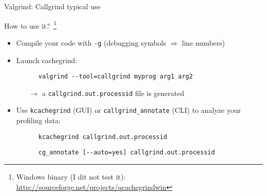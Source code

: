 \documentclass[10pt,xcolor=table]{beamer}
\begin{document}

\begin{frame}[fragile]{Valgrind: Callgrind typical use}

  How to use it?~\footnote{Windows binary (I dit not test it):
    \url{http://sourceforge.net/projects/qcachegrindwin}}
  \begin{itemize}
  \item Compile your code with {\tt -g} (debugging symbols
    $\Rightarrow$ line numbers)
  \item Launch cachegrind:
    \begin{lstlisting}
      valgrind --tool=callgrind myprog arg1 arg2
    \end{lstlisting}
    \begin{itemize}
    \item[$\rightarrow$] a {\tt callgrind.out.processid} file is
      generated
    \end{itemize}
  \item Use {\tt kcachegrind} (GUI) or {\tt callgrind\_annotate} (CLI)
    to analyze your profiling data:
    \begin{lstlisting}
      kcachegrind callgrind.out.processid
    \end{lstlisting}

    \begin{lstlisting}
      cg_annotate [--auto=yes] callgrind.out.processid
    \end{lstlisting}
  \end{itemize}
\end{frame}
\end{document}
